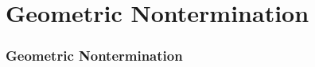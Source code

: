 \section{Geometric Nontermination}

\begin{frame} %
  \frametitle{Geometric Nontermination} %
\end{frame}